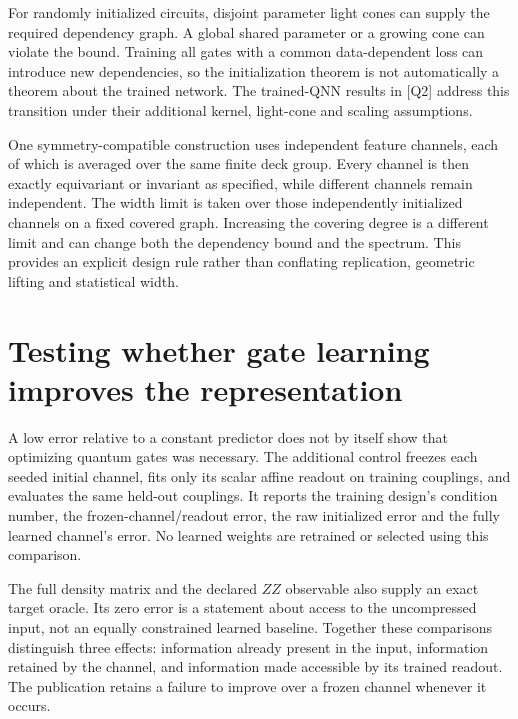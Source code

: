 For randomly initialized circuits, disjoint parameter light cones can supply the required dependency graph. A global shared parameter or a growing cone can violate the bound. Training all gates with a common data-dependent loss can introduce new dependencies, so the initialization theorem is not automatically a theorem about the trained network. The trained-QNN results in [Q2] address this transition under their additional kernel, light-cone and scaling assumptions.

One symmetry-compatible construction uses independent feature channels, each of which is averaged over the same finite deck group. Every channel is then exactly equivariant or invariant as specified, while different channels remain independent. The width limit is taken over those independently initialized channels on a fixed covered graph. Increasing the covering degree is a different limit and can change both the dependency bound and the spectrum. This provides an explicit design rule rather than conflating replication, geometric lifting and statistical width.

\section{Testing whether gate learning improves the representation}

A low error relative to a constant predictor does not by itself show that optimizing quantum gates was necessary. The additional control freezes each seeded initial channel, fits only its scalar affine readout on training couplings, and evaluates the same held-out couplings. It reports the training design's condition number, the frozen-channel/readout error, the raw initialized error and the fully learned channel's error. No learned weights are retrained or selected using this comparison.

The full density matrix and the declared $ZZ$ observable also supply an exact target oracle. Its zero error is a statement about access to the uncompressed input, not an equally constrained learned baseline. Together these comparisons distinguish three effects: information already present in the input, information retained by the channel, and information made accessible by its trained readout. The publication retains a failure to improve over a frozen channel whenever it occurs.
